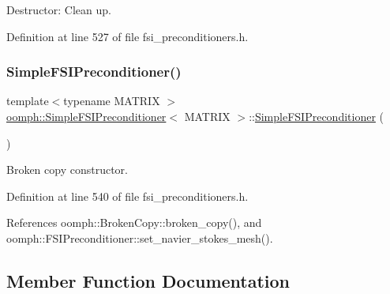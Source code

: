 Destructor\+: Clean up. 



Definition at line 527 of file fsi\+\_\+preconditioners.\+h.

\mbox{\label{classoomph_1_1SimpleFSIPreconditioner_a427e372b3153e9a26aa97c76d69e28a4}} 
\subsubsection{\texorpdfstring{Simple\+F\+S\+I\+Preconditioner()}{SimpleFSIPreconditioner()}\hspace{0.1cm}{\footnotesize\ttfamily [2/2]}}
{\footnotesize\ttfamily template$<$typename M\+A\+T\+R\+IX $>$ \\
\hyperlink{classoomph_1_1SimpleFSIPreconditioner}{oomph\+::\+Simple\+F\+S\+I\+Preconditioner}$<$ M\+A\+T\+R\+IX $>$\+::\hyperlink{classoomph_1_1SimpleFSIPreconditioner}{Simple\+F\+S\+I\+Preconditioner} (\begin{DoxyParamCaption}\item[{const \hyperlink{classoomph_1_1SimpleFSIPreconditioner}{Simple\+F\+S\+I\+Preconditioner}$<$ M\+A\+T\+R\+IX $>$ \&}]{ }\end{DoxyParamCaption})\hspace{0.3cm}{\ttfamily [inline]}}



Broken copy constructor. 



Definition at line 540 of file fsi\+\_\+preconditioners.\+h.



References oomph\+::\+Broken\+Copy\+::broken\+\_\+copy(), and oomph\+::\+F\+S\+I\+Preconditioner\+::set\+\_\+navier\+\_\+stokes\+\_\+mesh().



\subsection{Member Function Documentation}
\mbox{\label{classoomph_1_1SimpleFSIPreconditioner_abaf505c05ec128f4c3c6ff5036fb3db1}} 
